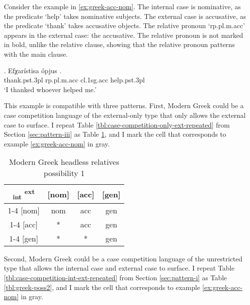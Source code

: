Consider the example in \ref{ex:greek-acc-nom}.
The internal case is nominative, as the predicate  `help' takes nominative subjects.
The external case is accusative, as the predicate  `thank' takes accusative objects.
The relative pronoun  `\ac{rp}.\ac{pl}.\ac{m}.\ac{acc}' appears in the external case: the accusative. The relative pronoun is not marked in bold, unlike the relative clause, showing that the relative pronoun patterns with the main clause.

\exg. Efχarístisa ópjus  .\\
thank.\ac{pst}.3\ac{pl}\scsub{[acc]} \ac{rp}.\ac{pl}.\ac{m}.\ac{acc} \ac{cl}.1\ac{sg}.\ac{acc} help.\ac{pst}.3\ac{pl}\scsub{[nom]}\\
`I thanked whoever helped me.' \label{ex:greek-acc-nom}

This example is compatible with three patterns. First, Modern Greek could be a case competition language of the external-only type that only allows the external case to surface. I repeat Table \ref{tbl:case-competition-only-ext-repeated} from Section \ref{sec:pattern-iii} as Table \ref{tbl:greek-poss1}, and I mark the cell that corresponds to example \ref{ex:greek-acc-nom} in gray.

 \begin{table}[ht]
   \center
   \caption{Modern Greek headless relatives possibility 1}
   \begin{tabular}{c|c|c|c}
     \toprule
     \textsubscript{\ac{int}} \textsuperscript{\ac{ext}}
            & [\ac{nom}]
            & [\ac{acc}]
            & [\ac{gen}]
            \\ \cmidrule{1-4}
        [\ac{nom}]
            & \ac{nom}
            & \cellcolor{LG}\ac{acc}
            & \ac{gen}
            \\ \cmidrule{1-4}
        [\ac{acc}]
            & *
            & \ac{acc}
            & \ac{gen}
            \\ \cmidrule{1-4}
        [\ac{gen}]
            & *
            & *
            & \ac{gen}
            \\
      \bottomrule
   \end{tabular}
     \label{tbl:greek-poss1}
 \end{table}

Second, Modern Greek could be a case competition language of the unrestricted type that allows the internal case and external case to surface. I repeat Table \ref{tbl:case-competition-int-ext-repeated} from Section \ref{sec:pattern-i} as Table \ref{tbl:greek-poss2}, and I mark the cell that corresponds to example \ref{ex:greek-acc-nom} in gray.


